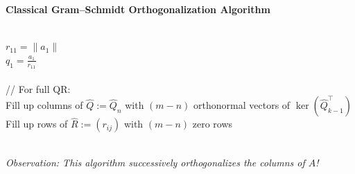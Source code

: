 \begin{frame}[c]
\textbf{Classical Gram--Schmidt Orthogonalization Algorithm}\\~\\
\hspace*{1cm}
\begin{minipage}{0.8\textwidth}
\begin{algorithm}[H]
$r_{11} = \| a_1 \|$\\
$q_1 = \frac{a_1}{r_{11}}$\\
~\\
{\color{gray}// For full QR:}\\
Fill up columns of $\widehat{Q}:= \widehat{Q}_n$ with $(m-n)$ orthonormal vectors of $\ker(\widehat{Q}_{k-1}^\top)$\\
Fill up rows of $\widehat{R} := (r_{ij})$ with $(m-n)$ zero rows
\end{algorithm}
\end{minipage}
~\\
\textit{\color{cyan} Observation: This algorithm successively orthogonalizes the columns of $A$!}
 \end{frame}


